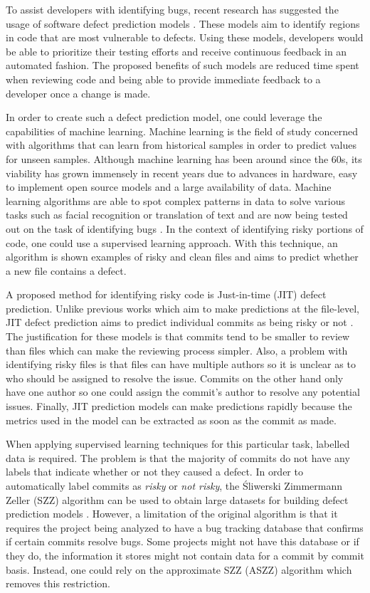 \documentclass[../main.tex]{subfiles}
\begin{document}
To assist developers with identifying bugs, recent research has suggested the usage of software defect prediction models \cite{kamei2013large}. These models aim to identify regions in code that are most vulnerable to defects. Using these models, developers would be able to prioritize their testing efforts and receive continuous feedback in an automated fashion. The proposed benefits of such models are reduced time spent when reviewing code and being able to provide immediate feedback to a developer once a change is made.

In order to create such a defect prediction model, one could leverage the capabilities of machine learning. Machine learning is the field of study concerned with algorithms that can learn from historical samples in order to predict values for unseen samples. Although machine learning has been around since the 60s, its viability has grown immensely in recent years due to advances in hardware, easy to implement open source models and a large availability of data. Machine learning algorithms are able to spot complex patterns in data to solve various tasks such as facial recognition or translation of text and are now being tested out on the task of identifying bugs \cite{nayrolles2018clever}. In the context of identifying risky portions of code, one could use a supervised learning approach. With this technique, an algorithm is shown examples of risky and clean files and aims to predict whether a new file contains a defect. 

A proposed method for identifying risky code is Just-in-time (JIT) defect prediction. Unlike previous works which aim to make predictions at the file-level, JIT defect prediction aims to predict individual commits as being risky or not \cite{kamei2013large}. The justification for these models is that commits tend to be smaller to review than files which can make the reviewing process simpler. Also, a problem with identifying risky files is that files can have multiple authors so it is unclear as to who should be assigned to resolve the issue. Commits on the other hand only have one author so one could assign the commit's author to resolve any potential issues. Finally, JIT prediction models can make predictions rapidly because the metrics used in the model can be extracted as soon as the commit as made. 

When applying supervised learning techniques for this particular task, labelled data is required. The problem is that the majority of commits do not have any labels that indicate whether or not they caused a defect. In order to automatically label commits as \textit{risky} or \textit{not risky}, the Śliwerski Zimmermann Zeller (SZZ) algorithm can be used to obtain large datasets for building defect prediction models \cite{sliwerski2005changes}. However, a limitation of the original algorithm is that it requires the project being analyzed to have a bug tracking database that confirms if certain commits resolve bugs. Some projects might not have this database or if they do, the information it stores might not contain data for a commit by commit basis. Instead, one could rely on the approximate SZZ (ASZZ) algorithm which removes this restriction. 
\end{document}
